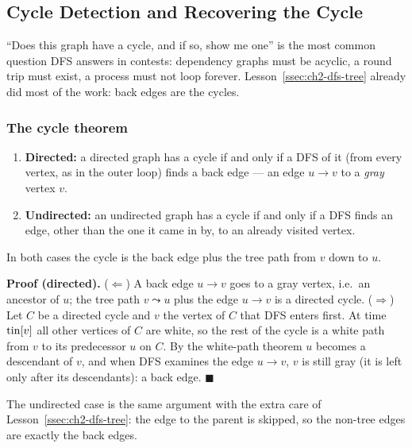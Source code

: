 \subsection{Cycle Detection and Recovering the Cycle}
\label{ssec:ch2-cycles}

``Does this graph have a cycle, and if so, show me one'' is the most common question DFS answers in contests: dependency graphs must be acyclic, a round trip must exist, a process must not loop forever. Lesson~\ref{ssec:ch2-dfs-tree} already did most of the work: back edges are the cycles.

\subsubsection*{The cycle theorem}

\begin{theorembox}
\begin{enumerate}[leftmargin=*]
    \item \textbf{Directed:} a directed graph has a cycle if and only if a DFS of it (from every vertex, as in the outer loop) finds a back edge --- an edge $u \to v$ to a \emph{gray} vertex $v$.
    \item \textbf{Undirected:} an undirected graph has a cycle if and only if a DFS finds an edge, other than the one it came in by, to an already visited vertex.
\end{enumerate}
In both cases the cycle is the back edge plus the tree path from $v$ down to $u$.
\end{theorembox}

\textbf{Proof (directed).} ($\Leftarrow$) A back edge $u \to v$ goes to a gray vertex, i.e.\ an ancestor of $u$; the tree path $v \leadsto u$ plus the edge $u \to v$ is a directed cycle.
($\Rightarrow$) Let $C$ be a directed cycle and $v$ the vertex of $C$ that DFS enters first. At time $\mathrm{tin}[v]$ all other vertices of $C$ are white, so the rest of the cycle is a white path from $v$ to its predecessor $u$ on $C$. By the white-path theorem $u$ becomes a descendant of $v$, and when DFS examines the edge $u \to v$, $v$ is still gray (it is left only after its descendants): a back edge. \hfill$\blacksquare$

The undirected case is the same argument with the extra care of Lesson~\ref{ssec:ch2-dfs-tree}: the edge to the parent is skipped, so the non-tree edges are exactly the back edges.

